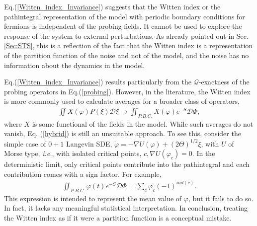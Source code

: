 \documentclass[final,5p,10pt,times,twocolumn,year]{elsarticle}
\begin{document}
Eq.(\ref{Witten_index_Invariance}) suggests that the Witten index or the pathintegral representation of the model with periodic boundary conditions for fermions is independent of the probing fields. It cannot be used to explore the response of the system to external perturbations. As already pointed out in Sec.\ref{Sec:STS}, this is a reflection of the fact that the Witten index is a representation of the partition function of the noise and not of the model, and the noise has no information about the dynamics in the model.

Eq.(\ref{Witten_index_Invariance}) results particularly from the $\mathcal Q$-exactness of the probing operators in Eq.(\ref{probing}). However, in the literature, the Witten index is more commonly used to calculate averages for a broader class of operators,
\begin{eqnarray}
    \iint X(\varphi)P(\xi) \mathcal{D}\xi \to  \iint_{P.B.C.} X(\varphi) e^{-S} \mathcal{D}\Phi,\label{hybrid}
\end{eqnarray}
where $X$ is some functional of the fields in the model. While such averages do not vanish, Eq. (\ref{hybrid}) is still an unsuitable approach. To see this, consider the simple case of $0+1$ Langevin SDE, $\dot \varphi = - \nabla U(\varphi) + (2\Theta)^{1/2} \xi$, with $U$ of Morse type, \emph{i.e.}, with isolated critical points, $c, \nabla U(\varphi_c) =0$. In the deterministic limit, only critical points contribute into the pathintegral and each contribution comes with a sign factor. For example, 
\begin{eqnarray}
    \iint_{P.B.C.} \varphi(t) e^{-S} \mathcal{D}\Phi = \sum\nolimits_{c} \varphi_{c}(-1)^{ind(c)}.\label{NoSense}
\end{eqnarray}
This expression is intended to represent the mean value of $\varphi$, but it fails to do so. In fact, it lacks any meaningful statistical interpretation. In conclusion, treating the Witten index as if it were a partition function is a conceptual mistake.

 

\end{document}
